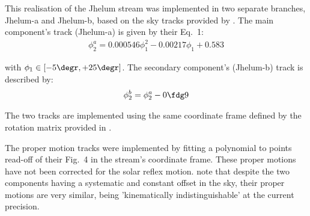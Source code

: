 This realisation of the Jhelum stream was implemented in two separate branches, Jhelum-a and Jhelum-b, based on the sky tracks provided by \citet{Bonaca2019}. The main component's track (Jhelum-a) is given by their Eq.~1:
\begin{eqnarray*}
\phi_2^a = 0.000546\phi_1^2 -0.00217\phi_1 + 0.583
\end{eqnarray*}

with $\phi_1 \in [-5\degr,+25\degr]$. The secondary component's (Jhelum-b) track is described 
by: 
\begin{eqnarray*}
\phi_2^b = \phi_2^a - 0\fdg9
\end{eqnarray*}

The two tracks are implemented using the same coordinate frame defined by the rotation matrix provided in \citet[][their Sec.~2]{Bonaca2019}.

The proper motion tracks were implemented by fitting a polynomial to points read-off of their Fig.~4 in the stream's coordinate frame. These proper motions have not been corrected for the solar reflex motion. \citet{Bonaca2019} note that despite the two components having a systematic and constant offset in the sky, their proper motions are very similar, being 'kinematically indistinguishable' at the current precision.

